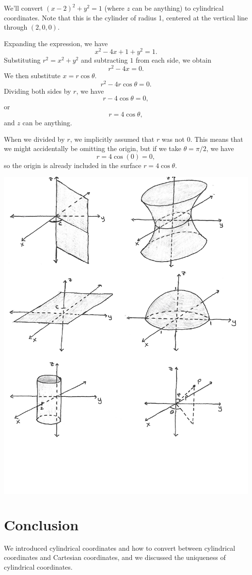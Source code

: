 \documentclass{ximera}
\begin{document}
\begin{example}
We'll convert $(x-2)^2 + y^2 = 1$ (where $z$ can be anything) to cylindrical coordinates. Note that this is the cylinder of radius 1, centered at the vertical line through $(2,0,0)$.

Expanding the expression, we have
\[
x^2-4x+1+y^2 =1.
\]
Substituting $r^2 = x^2+y^2$ and subtracting $1$ from each side, we obtain
\[
r^2-4x=0.
\]
We then substitute $x = r\cos\theta$.
\[
r^2-4r\cos\theta = 0.
\]
Dividing both sides by $r$, we have
\[
r-4\cos\theta = 0,
\]
or
\[
r = 4\cos\theta,
\]
and $z$ can be anything.

When we divided by $r$, we implicitly assumed that $r$ was not $0$. This means that we might accidentally be omitting the origin, but if we take $\theta = \pi/2$, we have
\[
r = 4\cos(0) = 0,
\]
so the origin is already included in the surface $r = 4\cos\theta$.

\begin{image}
\includegraphics{cylinder_100}
\end{image}
\end{example}

\section{Conclusion}

We introduced cylindrical coordinates and how to convert between cylindrical coordinates and Cartesian coordinates, and we discussed the uniqueness of cylindrical coordinates.
\end{document}
